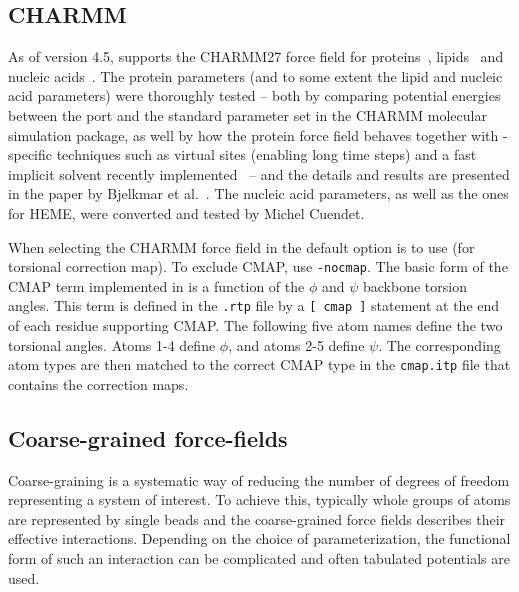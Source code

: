\subsection{CHARMM}

As of version 4.5, {\gromacs} supports the CHARMM27 force field for proteins~\cite{mackerell04, mackerell98}, lipids~\cite{feller00} and nucleic acids~\cite{foloppe00}. The protein parameters (and to some extent the lipid and nucleic acid parameters) were thoroughly tested -- both by comparing potential energies between the port and the standard parameter set in the CHARMM molecular simulation package, as well by how the protein force field behaves together with {\gromacs}-specific techniques such as virtual sites (enabling long time steps) and a fast implicit solvent recently implemented~\cite{Larsson10} -- and the details and results are presented in the paper by Bjelkmar et al.~\cite{Bjelkmar10}. The nucleic acid parameters, as well as the ones for HEME, were converted and tested by Michel Cuendet.

When selecting the CHARMM force field in {\tt {}} the default option is to use  (for torsional correction map). To exclude CMAP, use {\tt -nocmap}. The basic form of the CMAP term implemented in {\gromacs} is a function of the $\phi$ and $\psi$ backbone torsion angles. This term is defined in the {\tt .rtp} file by a {\tt [ cmap ]} statement at the end of each residue supporting CMAP. The following five atom names define the two torsional angles. Atoms 1-4 define $\phi$, and atoms 2-5 define $\psi$. The corresponding atom types are then matched to the correct CMAP type in the {\tt cmap.itp} file that contains the correction maps.

\subsection{Coarse-grained force-fields}
\label{sec:cg-forcefields}
Coarse-graining is a systematic way of reducing the number of degrees of freedom representing a system of interest. To achieve this, typically whole groups of atoms are represented by single beads and the coarse-grained force fields describes their effective interactions. Depending on the choice of parameterization, the functional form of such an interaction can be complicated and often tabulated potentials are used.


